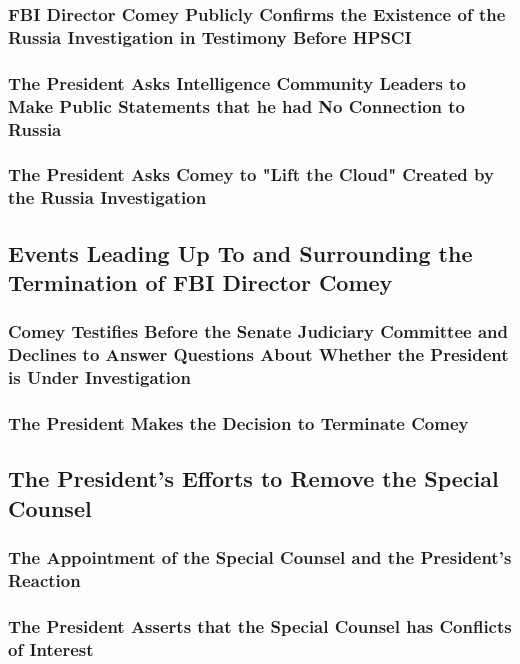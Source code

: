 \subsubsection{FBI Director Comey Publicly Confirms the Existence of the Russia Investigation in Testimony Before HPSCI}

\subsubsection{The President Asks Intelligence Community Leaders to Make Public Statements that he had No Connection to Russia}

\subsubsection{The President Asks Comey to "Lift the Cloud" Created by the Russia Investigation}

\subsection{Events Leading Up To and Surrounding the Termination of FBI Director Comey}

\subsubsection{Comey Testifies Before the Senate Judiciary Committee and Declines to Answer Questions About Whether the President is Under Investigation}

\subsubsection{The President Makes the Decision to Terminate Comey}

\subsection{The President's Efforts to Remove the Special Counsel}

\subsubsection{The Appointment of the Special Counsel and the President's Reaction}

\subsubsection{The President Asserts that the Special Counsel has Conflicts of Interest}

